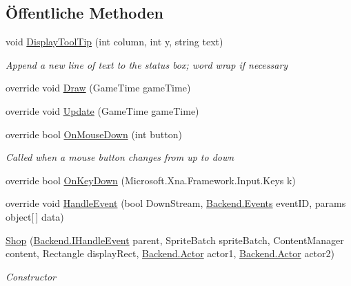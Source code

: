 \subsection*{Öffentliche Methoden}
\begin{DoxyCompactItemize}
\item 
void \hyperlink{class_gruppe22_1_1_client_1_1_shop_a4d05237c2675b7b593417b8ee6f9896b}{Display\-Tool\-Tip} (int column, int y, string text)
\begin{DoxyCompactList}\small\item\em Append a new line of text to the status box; word wrap if necessary \end{DoxyCompactList}\item 
override void \hyperlink{class_gruppe22_1_1_client_1_1_shop_ade0a07f29b074538cafdd5dedabc906b}{Draw} (Game\-Time game\-Time)
\item 
override void \hyperlink{class_gruppe22_1_1_client_1_1_shop_acb19ef7e140c9eb1a873cb0178e7aae3}{Update} (Game\-Time game\-Time)
\item 
override bool \hyperlink{class_gruppe22_1_1_client_1_1_shop_a38e6f534bd8c651103d61bcee914f60e}{On\-Mouse\-Down} (int button)
\begin{DoxyCompactList}\small\item\em Called when a mouse button changes from up to down \end{DoxyCompactList}\item 
override bool \hyperlink{class_gruppe22_1_1_client_1_1_shop_ad56f17fd523aa1984251aded8e00a8d3}{On\-Key\-Down} (Microsoft.\-Xna.\-Framework.\-Input.\-Keys k)
\item 
override void \hyperlink{class_gruppe22_1_1_client_1_1_shop_a940b015eb2925298e2c80571ae4bfe15}{Handle\-Event} (bool Down\-Stream, \hyperlink{namespace_gruppe22_1_1_backend_ab56df91bb0bdafa1ea978e552209ce73}{Backend.\-Events} event\-I\-D, params object\mbox{[}$\,$\mbox{]} data)
\item 
\hyperlink{class_gruppe22_1_1_client_1_1_shop_a547d78600127bdd96b2058c952186599}{Shop} (\hyperlink{interface_gruppe22_1_1_backend_1_1_i_handle_event}{Backend.\-I\-Handle\-Event} parent, Sprite\-Batch sprite\-Batch, Content\-Manager content, Rectangle display\-Rect, \hyperlink{class_gruppe22_1_1_backend_1_1_actor}{Backend.\-Actor} actor1, \hyperlink{class_gruppe22_1_1_backend_1_1_actor}{Backend.\-Actor} actor2)
\begin{DoxyCompactList}\small\item\em Constructor \end{DoxyCompactList}\end{DoxyCompactItemize}
